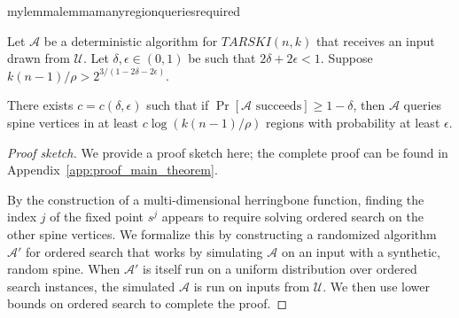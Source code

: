 \documentclass[11pt]{article}
\begin{document}
\begin{restatable}{mylemma}{lemmamanyregionqueriesrequired}
\label{lem:many-region-queries-required}

Let $\mathcal{A}$ be a deterministic algorithm for $TARSKI(n, k)$ that receives an input drawn from $\mathcal{U}$. Let $\delta, \epsilon \in (0, 1)$ be such that $2\delta + 2\epsilon < 1$. Suppose $k(n-1)/\rho > 2^{3/(1-2\delta-2\epsilon)}$.

There exists $c = c(\delta, \epsilon)$ such that if $\Pr [\text{$\mathcal{A}$ succeeds}] \geq 1-\delta$, then $\mathcal{A}$ queries spine vertices in at least $c \log(k(n-1)/\rho)$ regions with probability at least $\epsilon$.
\end{restatable}

%

\begin{proof}[Proof sketch] We provide a proof sketch here; the complete proof can be found in Appendix~\ref{app:proof_main_theorem}.

By the construction of a multi-dimensional herringbone function, finding the index $j$ of the fixed point $s^j$ appears to require solving ordered search on the other spine vertices. We formalize this by constructing a randomized algorithm $\mathcal{A}'$ for ordered search that works by simulating $\mathcal{A}$ on an input with a synthetic, random spine. When $\mathcal{A}'$ is itself run on a uniform distribution over ordered search instances, the simulated $\mathcal{A}$ is run on inputs from $\mathcal{U}$. We then use lower bounds on ordered search to complete the proof.
\end{proof}
\end{document}

